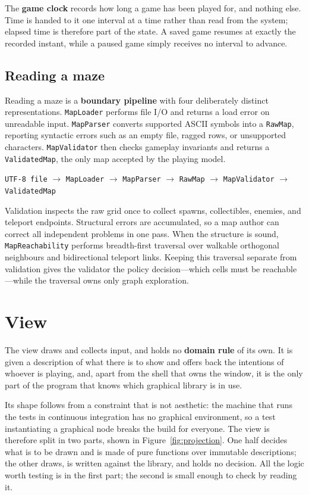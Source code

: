 The \textbf{game clock} records how long a game has been played for, and nothing else. Time is handed to it one
interval at a time rather than read from the system; elapsed time is therefore part of the state. A saved game resumes
at exactly the recorded instant, while a paused game simply receives no interval to advance.

\subsection{Reading a maze}

Reading a maze is a \textbf{boundary pipeline} with four deliberately distinct representations. \texttt{MapLoader} performs
file I/O and returns a load error on unreadable input. \texttt{MapParser} converts supported ASCII symbols into a
\texttt{RawMap}, reporting syntactic errors such as an empty file, ragged rows, or unsupported characters.
\texttt{MapValidator} then checks gameplay invariants and returns a \texttt{ValidatedMap}, the only map accepted by
the playing model.

\begin{center}
  \small
  \texttt{UTF-8 file} $\rightarrow$ \texttt{MapLoader} $\rightarrow$ \texttt{MapParser} $\rightarrow$
  \texttt{RawMap} $\rightarrow$ \texttt{MapValidator} $\rightarrow$ \texttt{ValidatedMap}
\end{center}

Validation inspects the raw grid once to collect spawns, collectibles, enemies, and teleport endpoints. Structural
errors are accumulated, so a map author can correct all independent problems in one pass. When the structure is sound,
\texttt{MapReachability} performs breadth-first traversal over walkable orthogonal neighbours and bidirectional
teleport links. Keeping this traversal separate from validation gives the validator the policy decision---which cells
must be reachable---while the traversal owns only graph exploration.

\section{View}
The view draws and collects input, and holds no \textbf{domain rule} of its own. It is given a description of what there is to show and
offers back the intentions of whoever is playing, and, apart from the shell that owns the window, it is the only part of the program that knows which graphical library is in use.

Its shape follows from a constraint that is not aesthetic: the machine that runs the tests in continuous integration
has no graphical environment, so a test instantiating a graphical node breaks the build for everyone. The view is therefore split in two parts, shown in Figure~\ref{fig:projection}. One half decides what is to be drawn and is made of pure
functions over immutable descriptions; the other draws, is written against the library, and holds no decision.
All the logic worth testing is in the first part; the second is small enough to check by reading it.

